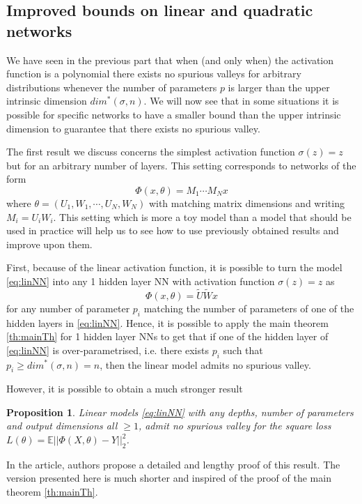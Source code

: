 \documentclass[11pt]{article} %
\newtheorem{proposition}{Proposition}[section]
\begin{document}
\subsection{Improved bounds on linear and quadratic networks}
We have seen in the previous part that when (and only when) the activation function is a polynomial there exists no spurious valleys for arbitrary distributions whenever the number of parameters $p$ is larger than the upper intrinsic dimension $dim^*(\sigma, n)$. 
We will now see that in some situations it is possible for specific networks to have a smaller bound than the upper intrinsic dimension to guarantee that there exists no spurious valley.
\par
The first result we discuss concerns the simplest activation function $\sigma(z) = z$ but for an arbitrary number of layers. This setting corresponds to networks of the form 
\begin{equation}\label{eq:linNN}
	\Phi(x,\theta) = M_1 \cdots M_N x
\end{equation} 
where $\theta = (U_1, W_1, \cdots, U_N, W_N)$ with matching matrix dimensions and writing $M_i = U_i W_i$.
This setting which is more a toy model than a model that should be used in practice will help us to see how to use previously obtained results and improve upon them.
\par
First, because of the linear activation function, it is possible to turn the model \ref{eq:linNN} into any 1 hidden layer NN with activation function $\sigma(z) = z$ as
\begin{equation}
	\Phi(x, \theta) = \tilde U \tilde W x
\end{equation}
for any number of parameter $p_i$ matching the number of parameters of one of the hidden layers in \ref{eq:linNN}.
Hence, it is possible to apply the main theorem \ref{th:mainTh} for 1 hidden layer NNs to get that if one of the hidden layer of \ref{eq:linNN} is over-parametrised, i.e. there exists $p_i$ such that $p_i \geq dim^*(\sigma, n) = n$, then the linear model admits no spurious valley.
\par
However, it is possible to obtain a much stronger result
\begin{proposition}
	Linear models \ref{eq:linNN} with any depths, number of parameters and output dimensions all $\geq 1$, admit no spurious valley for the square loss $L(\theta) = \mathbb{E}||\Phi(X, \theta) - Y||_2^2$.
\end{proposition}
In the article, authors propose a detailed and lengthy proof of this result. 
The version presented here is much shorter and inspired of the proof of the main theorem \ref{th:mainTh}.
\end{document}
